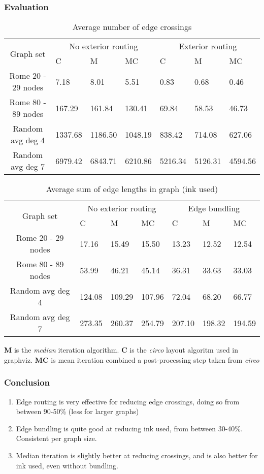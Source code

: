 \documentclass[12pt]{beamer}
\begin{document}
\begin{frame}
	\frametitle{Evaluation}
		
	\scriptsize {
		\begin{table}
		\centering
		\begin{tabular}{|c|lll|lll|} \hline
		\multirow{2}{*}{Graph set} & \multicolumn{3}{c|}{No exterior routing} & \multicolumn{3}{c|}{Exterior routing} \\ \cline{2-7}
					& C & M & MC & C & M & MC \\ \hline
		Rome 20 - 29 nodes & 7.18 & 8.01 & 5.51 & 0.83 & 0.68 & 0.46 \\
		Rome 80 - 89 nodes & 167.29 & 161.84 & 130.41 & 69.84 & 58.53 & 46.73 \\
		Random avg deg 4 & 1337.68 & 1186.50 & 1048.19 & 838.42 & 714.08 & 627.06 \\
		Random avg deg 7 & 6979.42 & 6843.71 & 6210.86 & 5216.34 & 5126.31 & 4594.56 \\ \hline
		\end{tabular}
		\caption{Average number of edge crossings}
	\end{table}
	}	
	
	\scriptsize {
	\begin{table}
	\centering
	\begin{tabular}{|c|lll|lll|} \hline
		\multirow{2}{*}{Graph set} & \multicolumn{3}{c|}{No exterior routing} & \multicolumn{3}{c|}{Edge bundling} \\ \cline{2-7}
					& C & M & MC & C & M & MC \\ \hline
		Rome 20 - 29 nodes & 17.16 & 15.49 & 15.50 & 13.23 & 12.52 & 12.54 \\
		Rome 80 - 89 nodes & 53.99 & 46.21 & 45.14 & 36.31 & 33.63 & 33.03 \\
		Random avg deg 4 & 124.08 & 109.29 & 107.96 & 72.04 & 68.20 & 66.77 \\
		Random avg deg 7 & 273.35 & 260.37 & 254.79 & 207.10 & 198.32 & 194.59 \\ \hline
	\end{tabular}
	\caption{Average sum of edge lengths in graph (ink used)}
	\end{table}
	}
	\textbf{M} is the \emph{median} iteration algorithm. \textbf{C} is the \emph{circo} layout algoritm used in graphviz. \textbf{MC} is mean iteration combined a post-processing step taken from \emph{circo}
\end{frame}	

\begin{frame}
	\frametitle{Conclusion}
	\begin{enumerate}
		\item Edge routing is very effective for reducing edge crossings, doing so from between 90-50\% (less for larger graphs)
		\item Edge bundling is quite good at reducing ink used, from between 30-40\%. Consistent per graph size.
		\item Median iteration is slightly better at reducing crossings, and is also better for ink used, even without bundling.
	\end{enumerate}
\end{frame}
\end{document}
